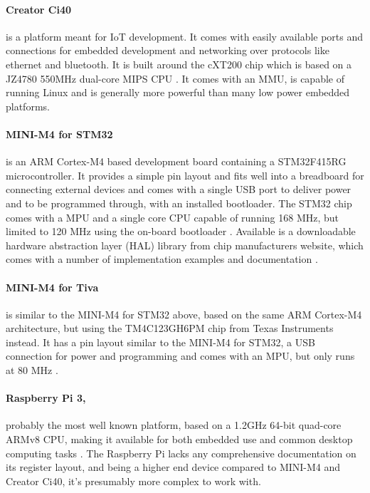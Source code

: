 \paragraph{Creator Ci40} is a platform meant for IoT development.
It comes with easily available ports and connections for embedded development
and networking over protocols like ethernet and bluetooth.
It is built around the cXT200 chip which is based on a JZ4780 550MHz dual-core MIPS CPU \cite{creator_ci40_specs}.
It comes with an MMU, is capable of running Linux
and is generally more powerful than many low power embedded platforms.

\paragraph{MINI-M4 for STM32} is an ARM Cortex-M4 based development board containing a STM32F415RG microcontroller.
It provides a simple pin layout and fits well into a breadboard for connecting external devices
and comes with a single USB port to deliver power and to be programmed through, with an installed bootloader.
The STM32 chip comes with a MPU and a single core CPU capable of running 168 MHz,
but limited to 120 MHz using the on-board bootloader \cite{MINI-M4_stm32_specs}.
Available is a downloadable hardware abstraction layer (HAL) library from chip manufacturers website,
which comes with a number of implementation examples and documentation \cite{HAL_library}.

\paragraph{MINI-M4 for Tiva} is similar to the MINI-M4 for STM32 above,
based on the same ARM Cortex-M4 architecture,
but using the TM4C123GH6PM chip from Texas Instruments instead.
It has a pin layout similar to the MINI-M4 for STM32,
a USB connection for power and programming and comes with an MPU,
but only runs at 80 MHz \cite{MINI-M4_tiva_specs}.

\paragraph{Raspberry Pi 3,} probably the most well known platform,
based on a 1.2GHz 64-bit quad-core ARMv8 CPU,
making it available for both embedded use and common desktop computing tasks \cite{raspberry_specs}.
The Raspberry Pi lacks any comprehensive documentation on its register layout,
and being a higher end device compared to MINI-M4 and Creator Ci40,
it's presumably more complex to work with.

